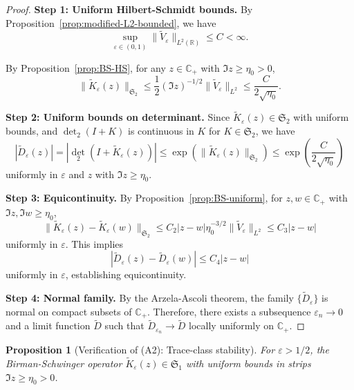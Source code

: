 ﻿\documentclass[12pt,a4paper]{article}
\newtheorem{proposition}[theorem]{Proposition}
\theoremstyle{definition}
\theoremstyle{remark}
\newcommand{\CC}{\mathbb{C}}
\newcommand{\RR}{\mathbb{R}}
\begin{document}
\begin{proof}
\textbf{Step 1: Uniform Hilbert-Schmidt bounds.}
By Proposition~\ref{prop:modified-L2-bounded}, we have
\[
  \sup_{\varepsilon \in (0,1)} \|\widetilde{V}_\varepsilon\|_{L^2(\RR)} \leq C < \infty.
\]

By Proposition~\ref{prop:BS-HS}, for any $z \in \CC_+$ with $\Im z \geq \eta_0 > 0$,
\[
  \|\widetilde{K}_\varepsilon(z)\|_{\mathfrak{S}_2} \leq \frac{1}{2} (\Im z)^{-1/2} \|\widetilde{V}_\varepsilon\|_{L^2} \leq \frac{C}{2\sqrt{\eta_0}}.
\]

\textbf{Step 2: Uniform bounds on determinant.}
Since $\widetilde{K}_\varepsilon(z) \in \mathfrak{S}_2$ with uniform bounds, and $\det_2(I + K)$ is continuous in $K$ for $K \in \mathfrak{S}_2$, we have
\[
  |\widetilde{D}_\varepsilon(z)| = |\det_2(I + \widetilde{K}_\varepsilon(z))| \leq \exp(\|\widetilde{K}_\varepsilon(z)\|_{\mathfrak{S}_2}) \leq \exp\left(\frac{C}{2\sqrt{\eta_0}}\right)
\]
uniformly in $\varepsilon$ and $z$ with $\Im z \geq \eta_0$.

\textbf{Step 3: Equicontinuity.}
By Proposition~\ref{prop:BS-uniform}, for $z, w \in \CC_+$ with $\Im z, \Im w \geq \eta_0$,
\[
  \|\widetilde{K}_\varepsilon(z) - \widetilde{K}_\varepsilon(w)\|_{\mathfrak{S}_2} \leq C_2 |z-w| \eta_0^{-3/2} \|\widetilde{V}_\varepsilon\|_{L^2} \leq C_3 |z-w|
\]
uniformly in $\varepsilon$. This implies
\[
  |\widetilde{D}_\varepsilon(z) - \widetilde{D}_\varepsilon(w)| \leq C_4 |z-w|
\]
uniformly in $\varepsilon$, establishing equicontinuity.

\textbf{Step 4: Normal family.}
By the Arzela-Ascoli theorem, the family $\{\widetilde{D}_\varepsilon\}$ is normal on compact subsets of $\CC_+$. Therefore, there exists a subsequence $\varepsilon_n \to 0$ and a limit function $\widetilde{D}$ such that $\widetilde{D}_{\varepsilon_n} \to \widetilde{D}$ locally uniformly on $\CC_+$.
\end{proof}

\begin{proposition}[Verification of (A2): Trace-class stability]\label{prop:verify-A2}
For $\varepsilon > 1/2$, the Birman-Schwinger operator $\widetilde{K}_\varepsilon(z) \in \mathfrak{S}_1$ with uniform bounds in strips $\Im z \geq \eta_0 > 0$.
\end{proposition}
\end{document}
